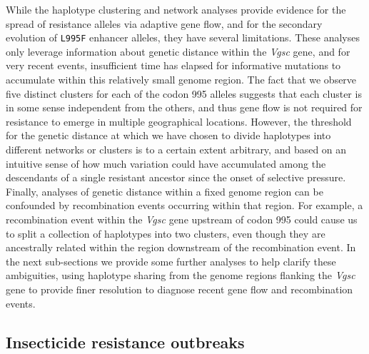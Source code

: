 \documentclass[a4paper,11pt,abstracton,hidelinks]{scrartcl}
\begin{document}
%
While the haplotype clustering and network analyses provide evidence for the spread of resistance alleles via adaptive gene flow, and for the secondary evolution of \texttt{L995F} enhancer alleles, they have several limitations.
%
These analyses only leverage information about genetic distance within the \textit{Vgsc} gene, and for very recent events, insufficient time has elapsed for informative mutations to accumulate within this relatively small genome region.
%
The fact that we observe five distinct clusters for each of the codon 995 alleles suggests that each cluster is in some sense independent from the others, and thus gene flow is not required for resistance to emerge in multiple geographical locations.
%
However, the threshold for the genetic distance at which we have chosen to divide haplotypes into different networks or clusters is to a certain extent arbitrary, and based on an intuitive sense of how much variation could have accumulated among the descendants of a single resistant ancestor since the onset of selective pressure.
%
Finally, analyses of genetic distance within a fixed genome region can be confounded by recombination events occurring within that region.
%
For example, a recombination event within the \textit{Vgsc} gene upstream of codon 995 could cause us to split a collection of haplotypes into two clusters, even though they are ancestrally related within the region downstream of the recombination event.
%
In the next sub-sections we provide some further analyses to help clarify these ambiguities, using haplotype sharing from the genome regions flanking the \textit{Vgsc} gene to provide finer resolution to diagnose recent gene flow and recombination events.


\subsection*{Insecticide resistance outbreaks}
\end{document}
